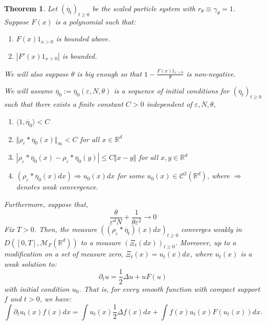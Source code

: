 \documentclass[a4paper,12pt]{article}
\newtheorem{theorem}{Theorem}[section]
\newcommand{\1}{{\bf {1}}}
\def\epsilon{\varepsilon}
\begin{document}
\begin{theorem} \label{TeoremOneStepConvergence}
Let $(\overline{\eta}_t)_{t \geq 0}$ be the scaled particle system with $r_\theta \equiv \gamma_\theta = 1$. Suppose $F(x)$ is a polynomial such that:
\begin{enumerate}
\item $F(x)1_{x>0}$  is bounded above.
\item $|F'(x)1_{x>0}|$ is bounded.
\end{enumerate}
We will also suppose $\theta$ is big enough so that $1- \frac{F(x)1_{x>0}}{\theta}$ is non-negative.

We will assume $\overline{\eta}_0:=\overline{\eta}_0(\epsilon,N,\theta)$ is a sequence of initial conditions for $(\overline{\eta}_t)_{t \geq 0}$ such that there exists a finite constant $C>0$ independent of $\epsilon, N, \theta$, 
\begin{enumerate}
\item $\langle 1 , \overline{\eta}_0 \rangle < C $
\item  $\Vert \rho_\epsilon * \overline{\eta}_0(x) \Vert_\infty < C$ for all $x \in \mathbb{R}^d$
\item $|\rho_\epsilon * \overline{\eta}_0(x) - \rho_\epsilon * \overline{\eta}_0(y)| \leq C \Vert x - y \Vert  $ for all $x,y \in \mathbb{R}^d$
\item $(\rho_\epsilon * \overline{\eta}_0(x) dx) \Rightarrow u_0(x)dx$ for some $u_0(x) \in \mathcal{C}^2(\mathbb{R}^d)$, where $\Rightarrow$ denotes weak convergence. 
\end{enumerate}
Furthermore, suppose that,
\begin{equation}
\frac{\theta}{\epsilon^d N} + \frac{1}{\theta \epsilon^{2}}\rightarrow 0 \label{ConditionsForConvergence}
\end{equation}
Fix $T>0$. Then, the measure $((\rho_\epsilon *\overline{\eta}_t)(x) dx)_{t \geq 0}$ converges weakly in $D([0,T], \mathcal{M}_F(\mathbb{R}^d))$ to a measure $(\Xi_t(dx))_{t \geq 0}$. Moreover, up to a modification on a set of measure zero, $\Xi_t(x) = u_t(x)dx$, where $u_t(x)$ is a weak solution to:
\[ \partial_t u = \frac{1}{2}\Delta u + u F(u) \]
with initial condition $u_0$. That is, for every smooth function with compact support $f$ and $t>0$, we have:
\begin{equation*}
 \int \partial_t  u_t(x) f(x) dx = \int u_t(x)\frac{1}{2} \Delta f(x) dx + \int f(x) u_t(x) F(u_t(x)) dx.
\end{equation*}
\end{theorem}
\end{document}
